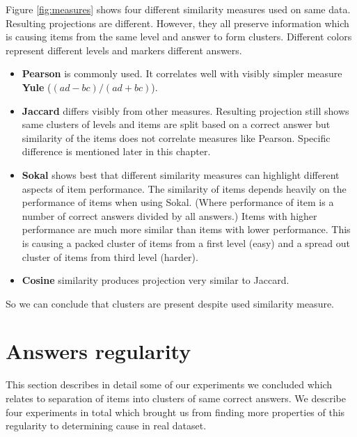 \documentclass[
  digital, %
  table,   %
  nolof,     %
  nolot,     %
  nocover,
  color,
  final, %
]{fithesis3}
\begin{document}

Figure \ref{fig:measures} shows four different similarity measures used on same data. Resulting projections are different. However, they all preserve information which is causing items from the same level and answer to form clusters. Different colors represent different levels and markers different answers.

\begin{itemize}
\item
  \textbf{Pearson} is commonly used. It correlates well with visibly simpler measure \textbf{Yule} ($(ad-bc)/(ad+bc)$).

\item
  \textbf{Jaccard} differs visibly from other measures. Resulting projection still shows same clusters of levels and items are split based on a correct answer but similarity of the items does not correlate measures like Pearson. Specific difference is mentioned later in this chapter.

\item
  \textbf{Sokal} shows best that different similarity measures can highlight different aspects of item performance. The similarity of items depends heavily on the performance of items when using Sokal. (Where performance of item is a number of correct answers divided by all answers.) Items with higher performance are much more similar than items with lower performance. This is causing a packed cluster of items from a first level (easy) and a spread out cluster of items from third level (harder).

\item
  \textbf{Cosine} similarity produces projection very similar to Jaccard.
\end{itemize}

So we can conclude that clusters are present despite used similarity measure.


\section{Answers regularity}\label{evaulation-answers-regularity}

This section describes in detail some of our experiments we concluded which relates to separation of items into clusters of same correct answers. We describe four experiments in total which brought us from finding more properties of this regularity to determining cause in real dataset.
\end{document}
